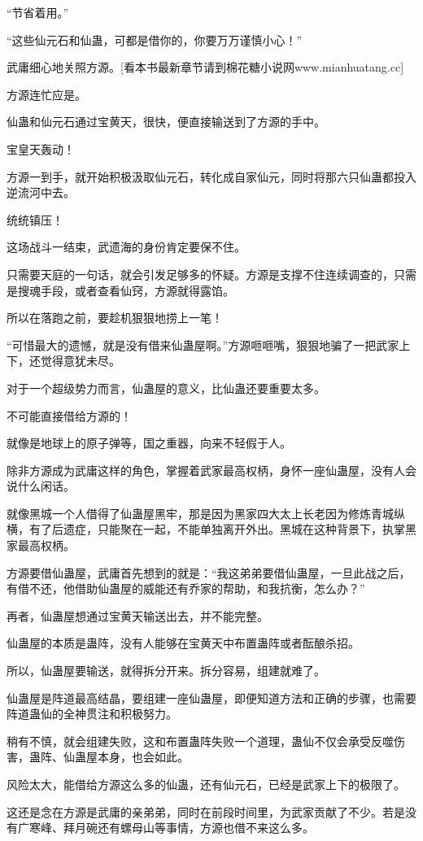 \begin{this_body}
“节省着用。”

“这些仙元石和仙蛊，可都是借你的，你要万万谨慎小心！”

武庸细心地关照方源。[看本书最新章节请到棉花糖小说网www.mianhuatang.cc]

方源连忙应是。

仙蛊和仙元石通过宝黄天，很快，便直接输送到了方源的手中。

宝皇天轰动！

方源一到手，就开始积极汲取仙元石，转化成自家仙元，同时将那六只仙蛊都投入逆流河中去。

统统镇压！

这场战斗一结束，武遗海的身份肯定要保不住。

只需要天庭的一句话，就会引发足够多的怀疑。方源是支撑不住连续调查的，只需是搜魂手段，或者查看仙窍，方源就得露馅。

所以在落跑之前，要趁机狠狠地捞上一笔！

“可惜最大的遗憾，就是没有借来仙蛊屋啊。”方源咂咂嘴，狠狠地骗了一把武家上下，还觉得意犹未尽。

对于一个超级势力而言，仙蛊屋的意义，比仙蛊还要重要太多。

不可能直接借给方源的！

就像是地球上的原子弹等，国之重器，向来不轻假于人。

除非方源成为武庸这样的角色，掌握着武家最高权柄，身怀一座仙蛊屋，没有人会说什么闲话。

就像黑城一个人借得了仙蛊屋黑牢，那是因为黑家四大太上长老因为修炼青城纵横，有了后遗症，只能聚在一起，不能单独离开外出。黑城在这种背景下，执掌黑家最高权柄。

方源要借仙蛊屋，武庸首先想到的就是：“我这弟弟要借仙蛊屋，一旦此战之后，有借不还，他借助仙蛊屋的威能还有乔家的帮助，和我抗衡，怎么办？”

再者，仙蛊屋想通过宝黄天输送出去，并不能完整。

仙蛊屋的本质是蛊阵，没有人能够在宝黄天中布置蛊阵或者酝酿杀招。

所以，仙蛊屋要输送，就得拆分开来。拆分容易，组建就难了。

仙蛊屋是阵道最高结晶，要组建一座仙蛊屋，即便知道方法和正确的步骤，也需要阵道蛊仙的全神贯注和积极努力。

稍有不慎，就会组建失败，这和布置蛊阵失败一个道理，蛊仙不仅会承受反噬伤害，蛊阵、仙蛊屋本身，也会如此。

风险太大，能借给方源这么多的仙蛊，还有仙元石，已经是武家上下的极限了。

这还是念在方源是武庸的亲弟弟，同时在前段时间里，为武家贡献了不少。若是没有广寒峰、拜月碗还有螺母山等事情，方源也借不来这么多。


\end{this_body}
